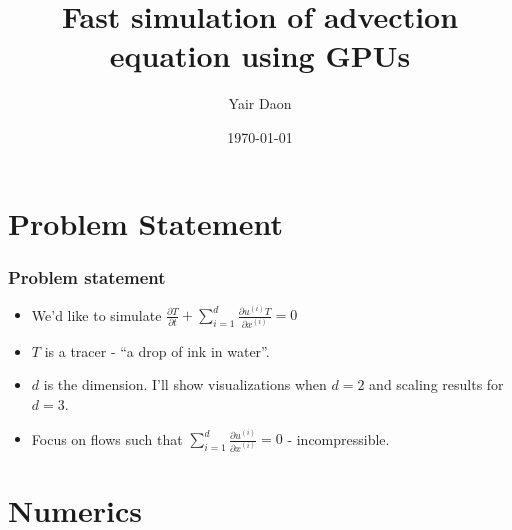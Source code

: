 \documentclass[]{beamer}
\title{Fast simulation of advection equation using GPUs}    %
\author{Yair Daon}                 %
\institute{Courant Institute}      %
\date{\today}                    %
\begin{document}
\begin{frame}
  \titlepage
\end{frame}

\section{Problem Statement}
\begin{frame}
  \frametitle{Problem statement}   %

  \begin{itemize}
  \item We'd like to simulate $\frac{\partial T}{\partial t} + \sum_{i=1}^{d} \frac{\partial u^{(i)}T}{\partial x^{(i)}} = 0$ 
  \item $T$ is a tracer - ``a drop of ink in water''.
  \item $d$ is the dimension. I'll show visualizations when $d=2$ and scaling results for $d=3$.
  \item Focus on flows such that $\sum_{i=1}^{d} \frac{\partial u^{(i)}}{\partial x^{(i)}} = 0$ - incompressible.
  \end{itemize}
\end{frame}





\section{Numerics}
\end{document}
